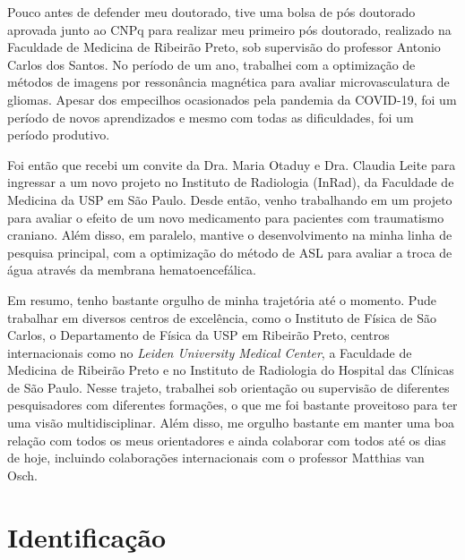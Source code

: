 \documentclass[a4paper,oneside,10pt]{article}
\begin{document}
\begin{onehalfspace}
Pouco antes de defender meu doutorado, tive uma bolsa de pós doutorado aprovada junto ao CNPq para realizar meu primeiro pós doutorado, realizado na Faculdade 
de Medicina de Ribeirão Preto, sob supervisão do professor Antonio Carlos dos Santos. No período de um ano, trabalhei com a optimização de métodos de imagens 
por ressonância magnética para avaliar microvasculatura de gliomas. Apesar dos empecilhos ocasionados pela pandemia da COVID-19, foi um período de novos 
aprendizados e mesmo com todas as dificuldades, foi um período produtivo. 

Foi então que recebi um convite da Dra. Maria Otaduy e Dra. Claudia Leite para ingressar a um novo projeto no Instituto de Radiologia (InRad), da Faculdade de Medicina da USP em 
São Paulo. Desde então, venho trabalhando em um projeto para avaliar o efeito de um novo medicamento para pacientes com traumatismo craniano. Além disso, em 
paralelo, mantive o desenvolvimento na minha linha de pesquisa principal, com a optimização do método de ASL para avaliar a troca de água através da membrana 
hematoencefálica.

Em resumo, tenho bastante orgulho de minha trajetória até o momento. Pude trabalhar em diversos centros de excelência, como o Instituto de Física de São Carlos,
o Departamento de Física da USP em Ribeirão Preto, centros internacionais como no \textit{ Leiden University Medical Center}, a Faculdade de Medicina de Ribeirão 
Preto e no Instituto de Radiologia do Hospital das Clínicas de São Paulo. Nesse trajeto, trabalhei sob orientação ou supervisão de diferentes pesquisadores com 
diferentes formações, o que me foi bastante proveitoso para ter uma visão multidisciplinar. Além disso, me orgulho bastante em manter uma boa relação com todos os 
meus orientadores e ainda colaborar com todos até os dias de hoje, incluindo colaborações internacionais com o professor Matthias van Osch. 

\end{onehalfspace}

\newpage
\section{Identificação}
\end{document}
